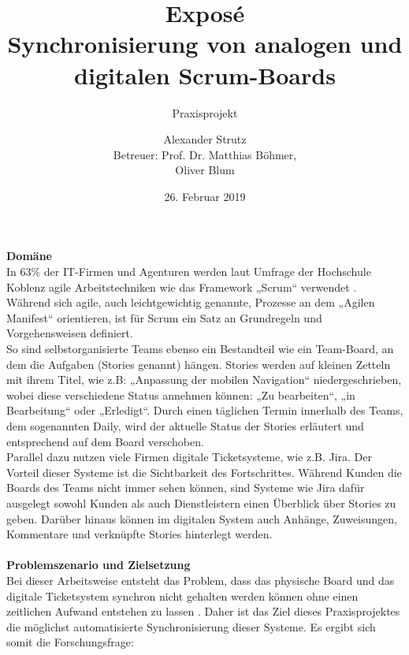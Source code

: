 \documentclass[12pt,titlepage]{scrartcl}
\begin{document}
	\begin{titlepage}
		\title{Exposé \\ \glqq Synchronisierung von analogen und digitalen Scrum-Boards\grqq{}} 
		\subtitle{Praxisprojekt}
		\author{Alexander Strutz \vspace{0.5cm}\\ Betreuer: 
		Prof. Dr. Matthias Böhmer,\\Oliver Blum}
 		\date{26. Februar 2019}
		\maketitle
	\end{titlepage}
	\textbf{Domäne} \\
	In 63\% der IT-Firmen und Agenturen werden laut Umfrage der Hochschule Koblenz agile Arbeitstechniken wie das Framework „Scrum“ verwendet \cite{hskob}. Während sich agile, auch leichtgewichtig genannte, Prozesse an dem „Agilen Manifest“ orientieren, ist für Scrum ein Satz an Grundregeln und Vorgehensweisen definiert. \\
So sind selbstorganisierte Teams ebenso ein Bestandteil wie ein Team-Board, an dem die Aufgaben (Stories genannt) hängen. Stories werden auf kleinen Zetteln mit ihrem Titel, wie z.B: „Anpassung der mobilen Navigation“ niedergeschrieben, wobei diese verschiedene Status annehmen können: „Zu bearbeiten“, „in Bearbeitung“ oder „Erledigt“. Durch einen täglichen Termin innerhalb des Teams, dem sogenannten Daily, wird der aktuelle Status der Stories erläutert und entsprechend auf dem Board verschoben. \\
Parallel dazu nutzen viele Firmen digitale Ticketsysteme, wie z.B. Jira. Der Vorteil dieser Systeme ist die Sichtbarkeit des Fortschrittes. Während Kunden die Boards des Teams nicht immer sehen können, sind Systeme wie Jira dafür ausgelegt sowohl Kunden als auch Dienstleistern einen Überblick über Stories zu geben. Darüber hinaus können im digitalen System auch Anhänge, Zuweisungen, Kommentare und verknüpfte Stories hinterlegt werden. \\ \\
\textbf{Problemszenario und Zielsetzung} \\
Bei dieser Arbeitsweise entsteht das Problem, dass das physische Board und das digitale Ticketsystem synchron  nicht gehalten werden können ohne einen zeitlichen Aufwand entstehen zu lassen \cite{sync}. Daher ist das Ziel dieses Praxisprojektes die möglichst automatisierte Synchronisierung dieser Systeme. Es ergibt sich somit die Forschungsfrage: \\
\end{document}
